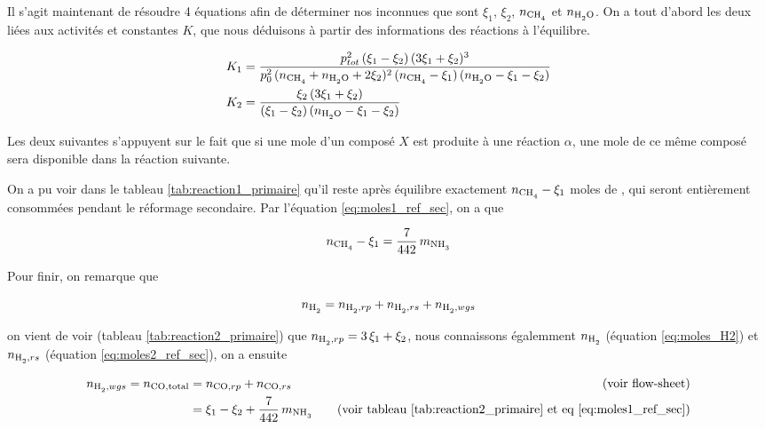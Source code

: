 \documentclass[a4paper, oneside, 12pt]{article}
\begin{document}
Il s'agit maintenant de résoudre 4 équations afin de déterminer nos inconnues que 
sont $\xi_1$, $\xi_2$, $n_{\ce{CH4}}$ et $n_{\ce{H2O}}$. 
On a tout d'abord les deux liées aux activités et constantes $K$, que nous déduisons
à partir des informations des réactions à l'équilibre.

\begin{align}
	K_1 &= \frac{p_{tot}^2 \, (\xi_1 - \xi_2) \, (3 \xi_1 + \xi_2)^3}
	{p_{0}^2 \, (n_{\ce{CH4}} + n_{\ce{H2O}} + 2 \xi_2)^2 \, (n_{\ce{CH4}} - 
	\xi_1) \, (n_{\ce{H2O}} - \xi_1 - \xi_2 )} 
	\label{eq:systeme1} \\
	K_2 &= \frac{\xi_2 \, (3 \xi_1 + \xi_2)}
	{(\xi_1 - \xi_2) \, (n_{\ce{H2O}} - \xi_1 - \xi_2)}
	\label{eq:systeme2}
\end{align}

Les deux suivantes s'appuyent sur le fait que si une mole d'un composé $X$ est
produite à une réaction $\alpha$, une mole de ce même composé sera disponible 
dans la réaction suivante.

On a pu voir dans le tableau \ref{tab:reaction1_primaire} qu'il reste après 
équilibre exactement $n_{\ce{CH4}} - \xi_1$ moles de , qui seront 
entièrement consommées pendant le réformage secondaire. 
Par l'équation \ref{eq:moles1_ref_sec}, on a que 

\begin{equation}
	n_{\ce{CH4}} - \xi_1 = \frac{7}{442} \, m_{\ce{NH3}}
	\label{eq:systeme3}
\end{equation}

Pour finir, on remarque que 

\begin{equation*}
	n_{\ce{H2}} = n_{\ce{H2}, rp} + n_{\ce{H2}, rs} + n_{\ce{H2}, wgs}
\end{equation*}

on vient de voir (tableau \ref{tab:reaction2_primaire})
que $n_{\ce{H2}, rp} = 3 \, \xi_1 + \xi_2$, nous connaissons égalemment
$n_{\ce{H2}}$ (équation \ref{eq:moles_H2})
et $n_{\ce{H2}, rs}$ (équation \ref{eq:moles2_ref_sec}), on a ensuite 

\begin{align*}
	n_{\ce{H2}, wgs} = n_{\ce{CO}, \text{total}} 
	&= n_{\ce{CO}, rp} + n_{\ce{CO}, rs} \quad &\text{(voir flow-sheet)} \\
	&= \xi_1 - \xi_2 + \frac{7}{442} \, m_{\ce{NH3}} 
	\quad &\text{(voir tableau \ref{tab:reaction2_primaire} et eq \ref{eq:moles1_ref_sec})}
\end{align*}
\end{document}
